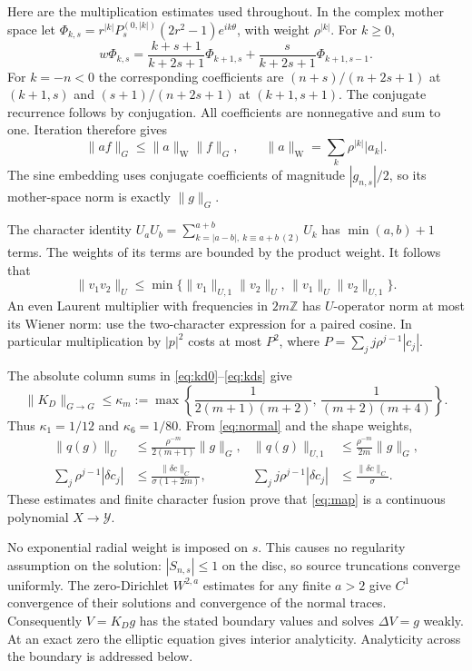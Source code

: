 \documentclass[11pt]{amsart}
\theoremstyle{remark}
\numberwithin{equation}{section}
\newcommand{\Z}{\mathbb Z}
\newcommand{\norm}[1]{\lVert#1\rVert}
\newcommand{\abs}[1]{\lvert#1\rvert}
\begin{document}
Here are the multiplication estimates used throughout. In the complex
mother space let
$\Phi_{k,s}=r^{|k|}P_s^{(0,|k|)}(2r^2-1)e^{ik\theta}$, with weight
$\rho^{|k|}$. For $k\ge0$,
\[
 w\Phi_{k,s}
 =\frac{k+s+1}{k+2s+1}\Phi_{k+1,s}
  +\frac{s}{k+2s+1}\Phi_{k+1,s-1}.
\]
For $k=-n<0$ the corresponding coefficients are
$(n+s)/(n+2s+1)$ at $(k+1,s)$ and
$(s+1)/(n+2s+1)$ at $(k+1,s+1)$. The conjugate recurrence follows by
conjugation. All coefficients are nonnegative and sum to one. Iteration
therefore gives
\begin{equation}\label{eq:wiener}
 \norm{af}_G\le \norm a_{\mathrm W}\norm f_G,\qquad
 \norm a_{\mathrm W}=\sum_k\rho^{|k|}\abs{a_k}.
\end{equation}
The sine embedding uses conjugate coefficients of magnitude
$|g_{n,s}|/2$, so its mother-space norm is exactly $\norm g_G$.

The character identity
$U_aU_b=\sum_{k=|a-b|,\ k\equiv a+b\ (2)}^{a+b}U_k$
has $\min(a,b)+1$ terms. The weights of its terms are bounded by the
product weight. It follows that
\begin{equation}\label{eq:fusion}
 \norm{v_1v_2}_U\le
 \min\{\norm{v_1}_{U,1}\norm{v_2}_U,\,
       \norm{v_1}_U\norm{v_2}_{U,1}\}.
\end{equation}
An even Laurent multiplier with frequencies in $2m\Z$ has $U$-operator
norm at most its Wiener norm: use the two-character expression for a
paired cosine. In particular multiplication by $\abs p^2$ costs at most
$P^2$, where $P=\sum_jj\rho^{j-1}|c_j|$.

The absolute column sums in \eqref{eq:kd0}--\eqref{eq:kds} give
\begin{equation}\label{eq:kappa}
 \norm{K_D}_{G\to G}\le\kappa_m
 :=\max\left\{\frac1{2(m+1)(m+2)},\,\frac1{(m+2)(m+4)}\right\}.
\end{equation}
Thus $\kappa_1=1/12$ and $\kappa_6=1/80$. From
\eqref{eq:normal} and the shape weights,
\begin{align}
 \norm{q(g)}_U&\le\frac{\rho^{-m}}{2(m+1)}\norm g_G,&
 \norm{q(g)}_{U,1}&\le\frac{\rho^{-m}}{2m}\norm g_G,\label{eq:qbound}\\
 \sum_j\rho^{j-1}|\delta c_j|&\le
       \frac{\norm{\delta c}_C}{\sigma(1+2m)},&
 \sum_jj\rho^{j-1}|\delta c_j|&\le
       \frac{\norm{\delta c}_C}{\sigma}.\label{eq:thetacorrect}
\end{align}
These estimates and finite character fusion prove that \eqref{eq:map}
is a continuous polynomial $X\to\mathcal Y$.

No exponential radial weight is imposed on $s$. This causes no
regularity assumption on the solution: $|S_{n,s}|\le1$ on the disc, so
source truncations converge uniformly. The zero-Dirichlet
$W^{2,a}$ estimates for any finite $a>2$ give $C^1$ convergence of their
solutions and convergence of the normal traces. Consequently
$V=K_Dg$ has the stated boundary values and solves $\Delta V=g$ weakly.
At an exact zero the elliptic equation gives interior analyticity.
Analyticity across the boundary is addressed below.
\end{document}
